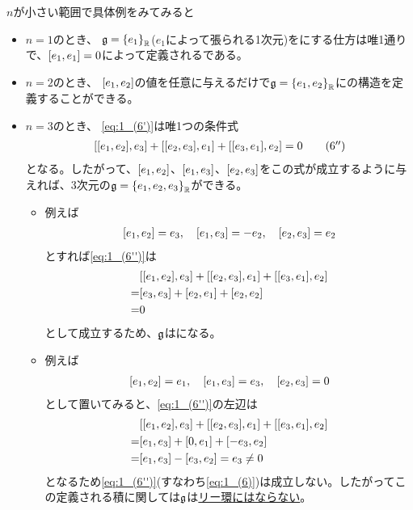 \documentclass[fleqn,twocolumn,titlepage,dvipdfmx]{jsarticle}
\begin{document}
\begin{remark}
  $n$が小さい範囲で具体例をみてみると
  \begin{itemize}
    \item $n=1$のとき、
      $\mathfrak{g}=\qty{e_{1}}_{\mathbb{R}}$($e_{1}$によって張られる1次元)を{}にする仕方は唯1通りで、$\comm{e_{1}}{e_{1}}=0$によって定義される{}である。
    \item $n=2$のとき、
      $\comm{e_{1}}{e_{2}}$の値を任意に与えるだけで$\mathfrak{g}=\qty{e_{1},e_{2}}_{\mathbb{R}}$に{}の構造を定義することができる。
    \item $n=3$のとき、
      \eqref{eq:1_(6')}は唯1つの条件式
      \begin{align*}
        \comm{\comm{e_{1}}{e_{2}}}{e_{3}}
        +\comm{\comm{e_{2}}{e_{3}}}{e_{1}}
        +\comm{\comm{e_{3}}{e_{1}}}{e_{2}}=0
        \tag{6$^{\dprime}$}\label{eq:1_(6'')}
      \end{align*}
      となる。したがって、$\comm{e_{1}}{e_{2}}$、$\comm{e_{1}}{e_{3}}$、$\comm{e_{2}}{e_{3}}$をこの式が成立するように与えれば、3次元の{}$\mathfrak{g}=\qty{e_{1},e_{2},e_{3}}_{\mathbb{R}}$ができる。
      \begin{itemize}
        \item[\cmark] 例えば
          \begin{align*}
            \comm{e_{1}}{e_{2}}=e_{3}\qc
            \comm{e_{1}}{e_{3}}=-e_{2}\qc
            \comm{e_{2}}{e_{3}}=e_{2}
          \end{align*}
          とすれば\eqref{eq:1_(6'')}は
          \begin{align*}
            &\comm{\comm{e_{1}}{e_{2}}}{e_{3}}
            +\comm{\comm{e_{2}}{e_{3}}}{e_{1}}
            +\comm{\comm{e_{3}}{e_{1}}}{e_{2}}\\
            =&\comm{e_{3}}{e_{3}}
            +\comm{e_{2}}{e_{1}}
            +\comm{e_{2}}{e_{2}}\\=&0
          \end{align*}
          として成立するため、$\mathfrak{g}$は{}になる。
        \item[\xmark] 例えば
          \begin{align*}
            \comm{e_{1}}{e_{2}}=e_{1}\qc
            \comm{e_{1}}{e_{3}}=e_{3}\qc
            \comm{e_{2}}{e_{3}}=0
          \end{align*}
          として置いてみると、\eqref{eq:1_(6'')}の左辺は
          \begin{align*}
            &\comm{\comm{e_{1}}{e_{2}}}{e_{3}}
            +\comm{\comm{e_{2}}{e_{3}}}{e_{1}}
            +\comm{\comm{e_{3}}{e_{1}}}{e_{2}}\\
            =&\comm{e_{1}}{e_{3}}
            +\comm{0}{e_{1}}
            +\comm{-e_{3}}{e_{2}}\\
            =&\comm{e_{1}}{e_{3}}
            -\comm{e_{3}}{e_{2}}
            =e_{3}\neq0
          \end{align*}
          となるため\eqref{eq:1_(6'')}(すなわち\eqref{eq:1_(6)})は成立しない。したがってこの定義される積に関しては$\mathfrak{g}$は\underline{リー環にはならない}。
      \end{itemize}
  \end{itemize}
\end{remark}
\end{document}
